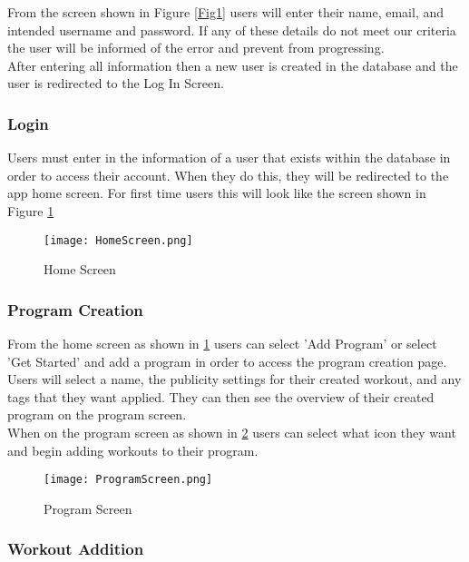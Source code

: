 \documentclass{article}
\begin{document}
From the screen shown in Figure \ref{Fig1} users will enter their name, email, and intended username and password. If any of these details do not meet our criteria the user will be informed of the error and prevent from progressing.\\
After entering all information then a new user is created in the database and the user is redirected to the Log In Screen.

\subsubsection{Login}

Users must enter in the information of a user that exists within the database in order to access their account. When they do this, they will be redirected to the app home screen. For first time users this will look like the screen shown in Figure \ref{FigHomeScreen} 

\begin{figure}[H]
    \centering
    \texttt{[image: HomeScreen.png]}
    \caption{Home Screen}
    \label{FigHomeScreen}
    \end{figure}

\subsubsection{Program Creation}

From the home screen as shown in \ref{FigHomeScreen} users can select 'Add Program' or select 'Get Started' and add a program in order to access the program creation page.\\
Users will select a name, the publicity settings for their created workout, and any tags that they want applied. They can then see the overview of their created program on the program screen.\\
When on the program screen as shown in \ref{FigProgramScreen} users can select what icon they want and begin adding workouts to their program.

\begin{figure}[H]
    \centering
    \texttt{[image: ProgramScreen.png]}
    \caption{Program Screen}
    \label{FigProgramScreen}
    \end{figure}

\subsubsection{Workout Addition}
\end{document}

